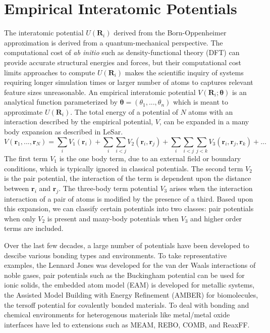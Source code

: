 \section{Empirical Interatomic Potentials}
The interatomic potential $U(\bm{R}_i)$ derived from the Born-Oppenheimer approximation is derived from a quantum-mechanical perspective.
The computational cost of \emph{ab initio} such as density-functional theory (DFT) can provide accurate structural energies and forces, but their computational cost limits approaches to compute $U(\bm{R}_i)$ makes the scientific inquiry of systems requiring longer simulation times or larger number of atoms to captures relevant feature sizes unreasonable.
An empirical interatomic potential $V(\bm{R}_i;\bm{\theta})$ is an analytical function parameterized by $\bm{\theta}=(\theta_1,...,\theta_n)$ which is meant to approximate $U(\bm{R}_i)$.  The total energy of a potential of $N$ atoms with an interaction described by the empirical potential, $V$, can be expanded in a many body expansion as described in LeSar\cite{lesar}.
\begin{equation}
	V(\bm{r}_1,...,\bm{r}_N)= \sum_i V_1(\bm{r}_i)
	        + \sum_i \sum_{i<j} V_2(\bm{r}_i,\bm{r}_j)
				  + \sum_i \sum_{i<j} \sum_{j<k} V_3(\bm{r}_i,\bm{r}_j,\bm{r}_k) + ...
\end{equation}
The first term $V_1$ is the one body term, due to an external field or boundary conditions, which is typically ignored in classical potentials.  The second term $V_2$ is the pair potential, the interaction of the term is dependent upon the distance between $\bm{r}_i$ and $\bm{r}_j$.  The three-body term potential $V_3$ arises when the interaction interaction of a pair of atoms is modified by the presence of a third.  Based upon this expansion, we can classify certain potentials into two classes: pair potentials when only $V_2$ is present and many-body potentials when $V_3$ and higher order terms are included.

Over the last few decades, a large number of potentials have been developed to descibe various bonding types and environments.
To take representative examples, the Lennard Jones was developed for the van der Waals interactions of noble gases, pair potentials such as the Buckingham potential can be used for ionic solids, the embedded atom model (EAM) is developed for metallic systems, the Assisted Model Building with Energy Refinement (AMBER) for biomolecules, the tersoff potential for covalently bonded materials.
To deal with bonding and chemical environments for heterogenous materials like metal/metal oxide interfaces have led to extensions such as MEAM, REBO, COMB, and ReaxFF.

